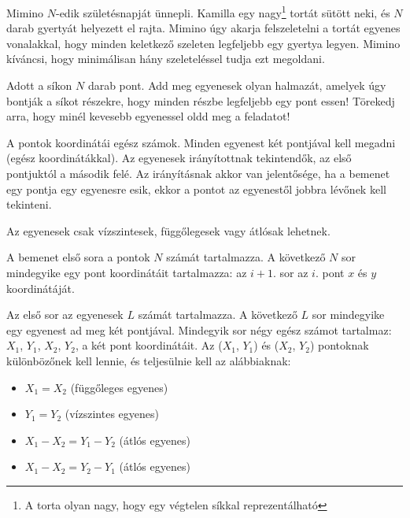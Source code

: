





Mimino $N$-edik születésnapját ünnepli. Kamilla egy nagy\footnote{A torta olyan nagy, hogy egy végtelen síkkal reprezentálható} tortát sütött neki, és $N$ darab gyertyát helyezett el rajta. Mimino úgy akarja felszeletelni a tortát egyenes vonalakkal, hogy minden keletkező szeleten legfeljebb egy gyertya legyen. Mimino kíváncsi, hogy minimálisan hány szeleteléssel tudja ezt megoldani.



Adott a síkon $N$ darab pont. Add meg egyenesek olyan halmazát, amelyek úgy bontják a síkot részekre, hogy minden részbe legfeljebb egy pont essen! Törekedj arra, hogy minél kevesebb egyenessel oldd meg a feladatot!

A pontok koordinátái egész számok. Minden egyenest két pontjával kell megadni (egész koordinátákkal). Az egyenesek irányítottnak tekintendők, az első pontjuktól a második felé. Az irányításnak akkor van jelentősége, ha a bemenet egy pontja egy egyenesre esik, ekkor a pontot az egyenestől jobbra lévőnek kell tekinteni.

Az egyenesek csak vízszintesek, függőlegesek vagy átlósak lehetnek.


A bemenet első sora a pontok $N$ számát tartalmazza. A következő $N$ sor mindegyike egy pont koordinátáit tartalmazza: az $i+1$. sor az $i$. pont $x$ és $y$ koordinátáját. 


Az első sor az egyenesek $L$ számát tartalmazza. A következő $L$ sor mindegyike egy egyenest ad meg két pontjával. Mindegyik sor négy egész számot tartalmaz: $X_1$, $Y_1$, $X_2$, $Y_2$, a két pont koordinátáit. Az ($X_1$, $Y_1$) és ($X_2$, $Y_2$) pontoknak különbözőnek kell lennie, és teljesülnie kell az alábbiaknak:

\begin{itemize}
  \item $X_1 = X_2$ (függőleges egyenes)
  \item $Y_1 = Y_2$ (vízszintes egyenes)
  \item $X_1 - X_2 = Y_1 - Y_2$ (átlós egyenes)
  \item $X_1 - X_2 = Y_2 - Y_1$ (átlós egyenes)
\end{itemize}

